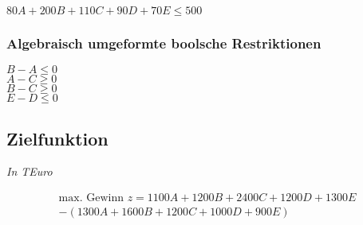 \documentclass[a4paper,11pt]{article}
\begin{document}
$80A + 200B + 110C + 90D + 70E \le 500$

\subsubsection*{Algebraisch umgeformte boolsche Restriktionen}
$B - A \le 0$ \\
$A - C \ge 0$ \\
$B - C \ge 0$ \\
$E - D \le 0$ \\


\subsection*{Zielfunktion}
\textit{In TEuro} \newline

\begin{multline*}
\text{max. Gewinn } z = 1100A + 1200B + 2400C + 1200D + 1300E\\ - (1300A + 1600B + 1200C + 1000D + 900E)
\end{multline*}
\end{document}
